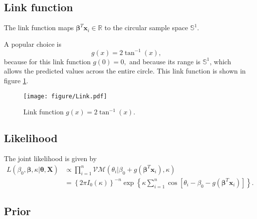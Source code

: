 \documentclass[12pt,a4paper]{article}
\begin{document}
\subsection{Link function}

The link function maps $\boldsymbol\beta^T \boldsymbol{x}_i \in \mathbb{R}$ to the circular sample space $\mathbb{S}^1$. 

A popular choice is 
\begin{equation}
g(x) = 2 \tan^{-1}(x),
\end{equation} because for this link function $g(0) = 0,$ and because its range is $\mathbb{S}^1$, which allows the predicted values across the entire circle. This link function is shown in figure \ref{linkfunc}.

\begin{figure}
{\centering \texttt{[image: figure/Link.pdf]} }
\caption{Link function $g(x) = 2 \tan^{-1}(x).$}
\label{linkfunc}
\end{figure}

\subsection{Likelihood}

The joint likelihood is given by
\begin{align}
L(\beta_0, \boldsymbol{\beta}, \kappa \vert \boldsymbol{\theta}, \boldsymbol{X}) &\propto  \prod_{i=1}^{n} \mathcal{VM}(\theta_i \vert \beta_0 + g(\boldsymbol\beta^T \boldsymbol{x}_i), \kappa) \\
&=  \left\lbrace 2 \pi I_0(\kappa) \right\rbrace^{-n} \exp \left\lbrace \kappa \sum_{i=1}^{n} \cos \left[ \theta_i - \beta_0 - g(\boldsymbol\beta^T \boldsymbol{x}_i) \right]  \right\rbrace. 
\end{align}


\subsection{Prior}
\end{document}
